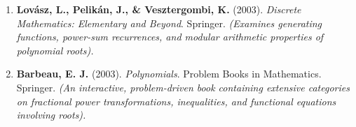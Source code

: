 \documentclass[10pt,a4paper]{article}
\begin{document}
\begin{enumerate}[leftmargin=*]
    \item \textbf{Lovász, L., Pelikán, J., \& Vesztergombi, K.} (2003). \textit{Discrete Mathematics: Elementary and Beyond}. Springer.
    \textit{(Examines generating functions, power-sum recurrences, and modular arithmetic properties of polynomial roots).}

    \item \textbf{Barbeau, E. J.} (2003). \textit{Polynomials}. Problem Books in Mathematics. Springer.
    \textit{(An interactive, problem-driven book containing extensive categories on fractional power transformations, inequalities, and functional equations involving roots).}
\end{enumerate}
\end{document}
